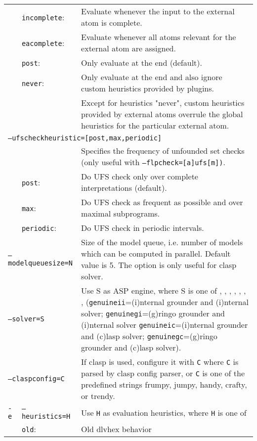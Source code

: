 \documentclass[a4paper, titlepage]{article}
\begin{document}
\begin{longtable}{ p{2.0em} p{2.2cm} p{0.6cm} p{8.0cm} }
&\texttt{incomplete}:&&Evaluate whenever the input to the external atom is complete.\\
&\texttt{eacomplete}:&& Evaluate whenever all atoms relevant for the external atom are assigned.\\
&\texttt{post}:&&Only evaluate at the end (default).\\
&\texttt{never}:&&Only evaluate at the end and also ignore custom heuristics provided by plugins.\\
&&&Except for heuristics "never", custom heuristics provided by external atoms overrule the global heuristics for the particular external atom.\\
\multicolumn{4}{l}{\texttt{--ufscheckheuristic=[post,max,periodic]}}\\
& & & Specifies the frequency of unfounded set checks (only useful with \texttt{--flpcheck=[a]ufs[m])}.\\
&\texttt{post}:&&Do UFS check only over complete interpretations (default).\\
&\texttt{max}:&&Do UFS check as frequent as possible and over maximal subprograms.\\
&\texttt{periodic}:&&Do UFS check in periodic intervals.\\
\multicolumn{3}{l}{\texttt{--modelqueuesize=N}} &
  Size of the model queue, i.e. number of models which can be computed in parallel. Default value is 5. The option is only useful for clasp solver.\\
\multicolumn{3}{l}{\texttt{--solver=S}} &
  Use S as ASP engine, where S is one of \dlv{}, \dlvdb{}, \libdlv{}, \libclingo{}, \genuineii{}, \genuinegi{}, \genuineic{}, \genuinegc{} (\texttt{genuineii}=(i)nternal grounder and (i)nternal solver; \texttt{genuinegi}=(g)ringo grounder and (i)nternal solver \texttt{genuineic}=(i)nternal grounder and (c)lasp solver; \texttt{genuinegc}=(g)ringo grounder and (c)lasp solver).\\
\multicolumn{3}{l}{\texttt{--claspconfig=C}} &
  If clasp is used, configure it with \texttt{C} where \texttt{C} is parsed by clasp config parser, or \texttt{C} is one of the predefined strings frumpy, jumpy, handy, crafty, or trendy.\\
\texttt{-e}& \multicolumn{2}{l}{\texttt{--heuristics=H}} &
Use \texttt{H} as evaluation heuristics, where \texttt{H} is one of\\
&\texttt{old}:&&Old dlvhex behavior\\

\end{longtable}
\end{document}
